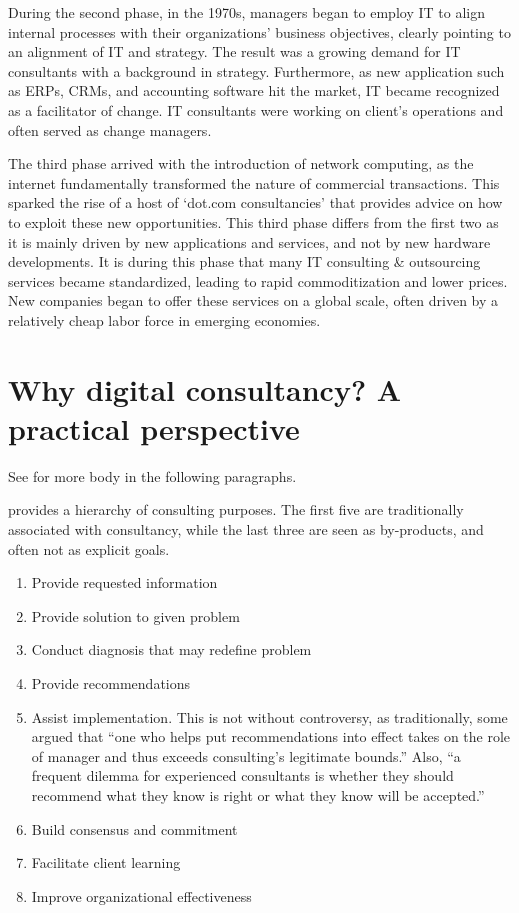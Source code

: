 \documentclass[12pt]{article}
\providecommand{\tightlist}{%
  \setlength{\itemsep}{0pt}\setlength{\parskip}{0pt}}
\begin{document}
During the second phase, in the 1970s, managers began to employ IT to
align internal processes with their organizations' business objectives,
clearly pointing to an alignment of IT and strategy. The result was a
growing demand for IT consultants with a background in strategy.
Furthermore, as new application such as ERPs, CRMs, and accounting
software hit the market, IT became recognized as a facilitator of
change. IT consultants were working on client's operations and often
served as change managers.

The third phase arrived with the introduction of network computing, as
the internet fundamentally transformed the nature of commercial
transactions. This sparked the rise of a host of `dot.com consultancies'
that provides advice on how to exploit these new opportunities. This
third phase differs from the first two as it is mainly driven by new
applications and services, and not by new hardware developments. It is
during this phase that many IT consulting \& outsourcing services became
standardized, leading to rapid commoditization and lower prices. New
companies began to offer these services on a global scale, often driven
by a relatively cheap labor force in emerging economies.

\hypertarget{why-digital-consultancy-a-practical-perspective}{%
\section{Why digital consultancy? A practical
perspective}\label{why-digital-consultancy-a-practical-perspective}}

See \citet{lacity1994} for more body in the following paragraphs.

\citet{turner1982} provides a hierarchy of consulting purposes. The
first five are traditionally associated with consultancy, while the last
three are seen as by-products, and often not as explicit goals.

\begin{enumerate}
\def\labelenumi{\arabic{enumi}.}
\tightlist
\item
  Provide requested information
\item
  Provide solution to given problem
\item
  Conduct diagnosis that may redefine problem
\item
  Provide recommendations
\item
  Assist implementation. This is not without controversy, as
  traditionally, some argued that ``one who helps put recommendations
  into effect takes on the role of manager and thus exceeds consulting's
  legitimate bounds.'' Also, ``a frequent dilemma for experienced
  consultants is whether they should recommend what they know is right
  or what they know will be accepted.''
\item
  Build consensus and commitment
\item
  Facilitate client learning
\item
  Improve organizational effectiveness
\end{enumerate}
\end{document}
